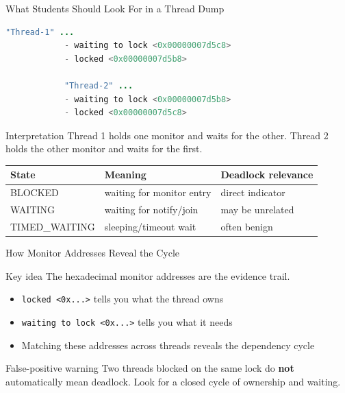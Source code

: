 \documentclass[aspectratio=169,11pt]{beamer}
\begin{document}
	\begin{frame}[fragile]{What Students Should Look For in a Thread Dump}
		\begin{lstlisting}[language=Java]
			"Thread-1" ...
			- waiting to lock <0x00000007d5c8>
			- locked <0x00000007d5b8>
			
			"Thread-2" ...
			- waiting to lock <0x00000007d5b8>
			- locked <0x00000007d5c8>
		\end{lstlisting}
		
		\vspace{0.3cm}
		
		\begin{alertblock}{Interpretation}
			Thread 1 holds one monitor and waits for the other.  
			Thread 2 holds the other monitor and waits for the first.
		\end{alertblock}
		
		\vspace{0.2cm}
		\centering
		\begin{tabular}{@{}lll@{}}
			\toprule
			\textbf{State} & \textbf{Meaning} & \textbf{Deadlock relevance} \\
			\midrule
			BLOCKED & waiting for monitor entry & direct indicator \\
			WAITING & waiting for notify/join & may be unrelated \\
			TIMED\_WAITING & sleeping/timeout wait & often benign \\
			\bottomrule
		\end{tabular}
	\end{frame}
	
	\begin{frame}{How Monitor Addresses Reveal the Cycle}
		\begin{block}{Key idea}
			The hexadecimal monitor addresses are the evidence trail.
		\end{block}
		
		\bigskip
		
		\begin{itemize}
			\item \texttt{locked <0x...>} tells you what the thread owns
			\item \texttt{waiting to lock <0x...>} tells you what it needs
			\item Matching these addresses across threads reveals the dependency cycle
		\end{itemize}
		
		\bigskip
		
		\begin{alertblock}{False-positive warning}
			Two threads blocked on the same lock do \textbf{not} automatically mean deadlock.  
			Look for a closed cycle of ownership and waiting.
		\end{alertblock}
	\end{frame}
	
\end{document}
